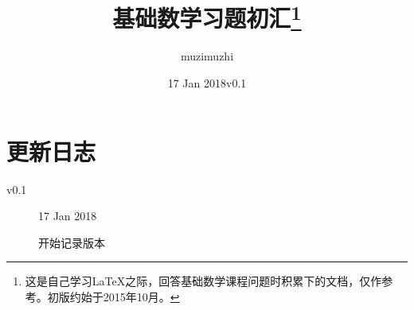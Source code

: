 \documentclass[fontset=none]{ctexart}
\title{基础数学习题初汇\thanks{这是自己学习\LaTeX 之际，回答基础数学课程问题时积累下的文档，仅作参考。初版约始于2015年10月。%
        }}
\author{muzimuzhi}
\date{17 Jan 2018\qquad v0.1}
\theoremstyle{plain}
\theoremstyle{definition}
\begin{document}
\maketitle
\tableofcontents
\newpage








\newpage
\section*{更新日志}

\begin{description}
    \item[v0.1] 17 Jan 2018
    
    开始记录版本
\end{description}
\end{document}

